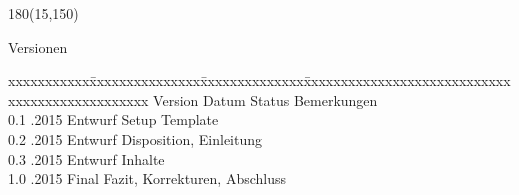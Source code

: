 
\begin{textblock}{180}(15,150)
\color{black}
\begin{huge}
Versionen
\end{huge}
\vspace{10mm}

\fontsize{10pt}{18pt}\selectfont
\begin{tabbing}
xxxxxxxxxxx\=xxxxxxxxxxxxxxx\=xxxxxxxxxxxxxx\=xxxxxxxxxxxxxxxxxxxxxxxxxxxxxxxxxxxxxxxxxxxxxxx \kill
Version	\> Datum	\> Status		\> Bemerkungen		\\
0.1	.2015	\> Entwurf		\> Setup Template	\\	
0.2	.2015	\> Entwurf		\> Disposition, Einleitung	\\	
0.3	.2015	\> Entwurf		\> Inhalte	\\	
1.0	.2015	\> Final		\> Fazit, Korrekturen, Abschluss	\\	

\end{tabbing}

\end{textblock}